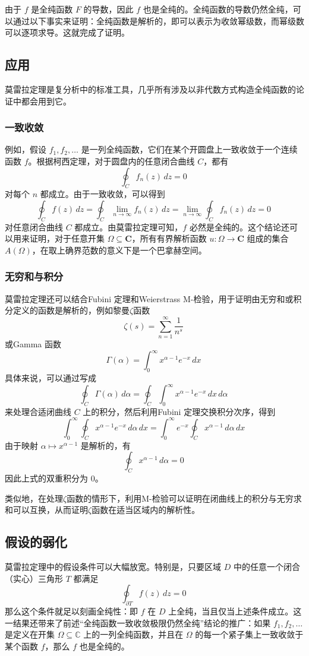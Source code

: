 由于 $f$ 是全纯函数 $F$ 的导数，因此 $f$ 也是全纯的。全纯函数的导数仍然全纯，可以通过以下事实来证明：全纯函数是解析的，即可以表示为收敛幂级数，而幂级数可以逐项求导。这就完成了证明。
\subsection{应用}
莫雷拉定理是复分析中的标准工具，几乎所有涉及以非代数方式构造全纯函数的论证中都会用到它。
\subsubsection{一致收敛}
例如，假设 $f_1, f_2, \dots$ 是一列全纯函数，它们在某个开圆盘上一致收敛于一个连续函数 $f$。根据柯西定理，对于圆盘内的任意闭合曲线 $C$，都有
$$
\oint_{C} f_n(z)\,dz = 0~
$$
对每个 $n$ 都成立。由于一致收敛，可以得到
$$
\oint_{C} f(z)\,dz
= \oint_{C} \lim_{n \to \infty} f_n(z)\,dz
= \lim_{n \to \infty} \oint_{C} f_n(z)\,dz
= 0~
$$
对任意闭合曲线 $C$ 都成立。由莫雷拉定理可知，$f$ 必然是全纯的。这个结论还可以用来证明，对于任意开集 $\Omega \subseteq \mathbf{C}$，所有有界解析函数 $u: \Omega \to \mathbf{C}$ 组成的集合 $A(\Omega)$，在取上确界范数的意义下是一个巴拿赫空间。
\subsubsection{无穷和与积分}
莫雷拉定理还可以结合Fubini 定理和Weierstrass M-检验，用于证明由无穷和或积分定义的函数是解析的，例如黎曼$\zeta$函数
$$
\zeta(s) = \sum_{n=1}^{\infty} \frac{1}{n^s}~
$$
或Gamma 函数
$$
\Gamma(\alpha) = \int_0^{\infty} x^{\alpha - 1} e^{-x} \, dx~
$$
具体来说，可以通过写成
$$
\oint_C \Gamma(\alpha) \, d\alpha
= \oint_C \int_0^{\infty} x^{\alpha - 1} e^{-x} \, dx \, d\alpha~
$$
来处理合适闭曲线 $C$ 上的积分，然后利用Fubini 定理交换积分次序，得到
$$
\int_0^{\infty} \oint_C x^{\alpha - 1} e^{-x} \, d\alpha \, dx
= \int_0^{\infty} e^{-x} \oint_C x^{\alpha - 1} \, d\alpha \, dx~
$$
由于映射 $\alpha \mapsto x^{\alpha - 1}$ 是解析的，有
$$
\oint_C x^{\alpha - 1} \, d\alpha = 0~
$$
因此上式的双重积分为 0。

类似地，在处理$\zeta$函数的情形下，利用M-检验可以证明在闭曲线上的积分与无穷求和可以互换，从而证明$\zeta$函数在适当区域内的解析性。
\subsection{假设的弱化}
莫雷拉定理中的假设条件可以大幅放宽。特别是，只要区域 $D$ 中的任意一个闭合（实心）三角形 $T$ 都满足
$$
\oint_{\partial T} f(z)\,dz = 0~
$$
那么这个条件就足以刻画全纯性：即 $f$ 在 $D$ 上全纯，当且仅当上述条件成立。这一结果还带来了前述“全纯函数一致收敛极限仍然全纯”结论的推广：如果 $f_1, f_2, \dots$ 是定义在开集 $\Omega \subseteq \mathbb{C}$ 上的一列全纯函数，并且在 $\Omega$ 的每一个紧子集上一致收敛于某个函数 $f$，那么 $f$ 也是全纯的。
